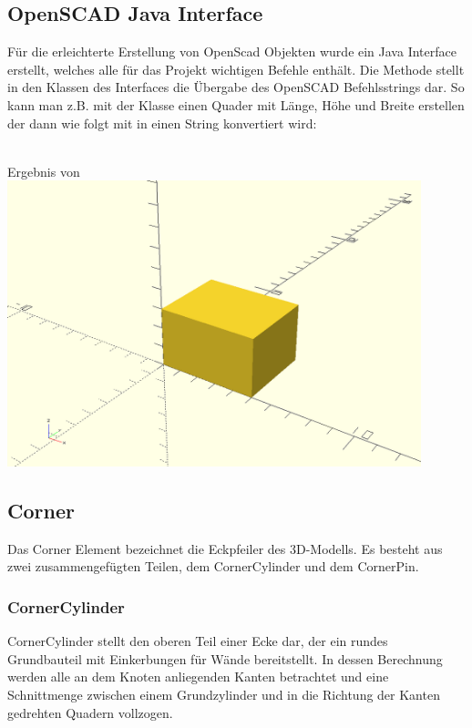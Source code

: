 \subsection{OpenSCAD Java Interface}
Für die erleichterte Erstellung von OpenScad Objekten wurde ein Java Interface  erstellt, welches alle für das Projekt wichtigen Befehle enthält.
Die Methode  stellt in den Klassen des Interfaces die Übergabe des OpenSCAD Befehlsstrings dar.
So kann man z.B. mit der Klasse  einen Quader mit Länge, Höhe und Breite erstellen der dann wie folgt mit  in einen String konvertiert wird:\\
\\
\begin{Bild}{Ergebnis von }
	\includegraphics[width = 120mm]{Bilder/Quader}
\end{Bild}



\subsection{Corner}
Das Corner Element bezeichnet die Eckpfeiler des 3D-Modells.
Es besteht aus zwei zusammengefügten Teilen, dem CornerCylinder und dem CornerPin.
\subsubsection{CornerCylinder}
CornerCylinder stellt den oberen Teil einer Ecke dar, der ein rundes Grundbauteil mit Einkerbungen für Wände bereitstellt.
In dessen Berechnung werden alle an dem Knoten anliegenden Kanten betrachtet und eine Schnittmenge zwischen einem Grundzylinder und in die Richtung der Kanten gedrehten Quadern vollzogen. 
